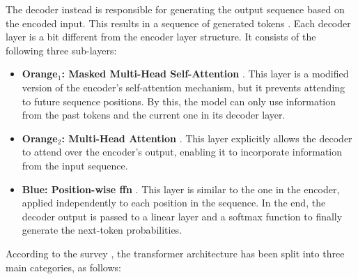  The decoder instead is responsible for generating the output sequence based on the encoded input. This results in a sequence of generated tokens \cite{raiaan_review_2024}. Each decoder layer is a bit different from the encoder layer structure. It consists of the following three sub-layers:

\begin{itemize}
    \item \textbf{Orange$_1$: Masked Multi-Head Self-Attention} \cite{vaswani_attention_2017}. This layer is a modified version of the encoder's self-attention mechanism, but it prevents attending to future sequence positions. By this, the model can only use information from the past tokens and the current one in its decoder layer.
    \item \textbf{Orange$_2$: Multi-Head Attention} \cite{vaswani_attention_2017}. This layer explicitly allows the decoder to attend over the encoder's output, enabling it to incorporate information from the input sequence.
    \item \textbf{Blue: Position-wise \ac{ffn}} \cite{vaswani_attention_2017}. This layer is similar to the one in the encoder, applied independently to each position in the sequence. In the end, the decoder output is passed to a linear layer and a softmax function to finally generate the next-token probabilities.
\end{itemize}

\pagebreak

 According to the survey \cite{shao_survey_2024}, the transformer architecture has been split into three main categories, as follows:

